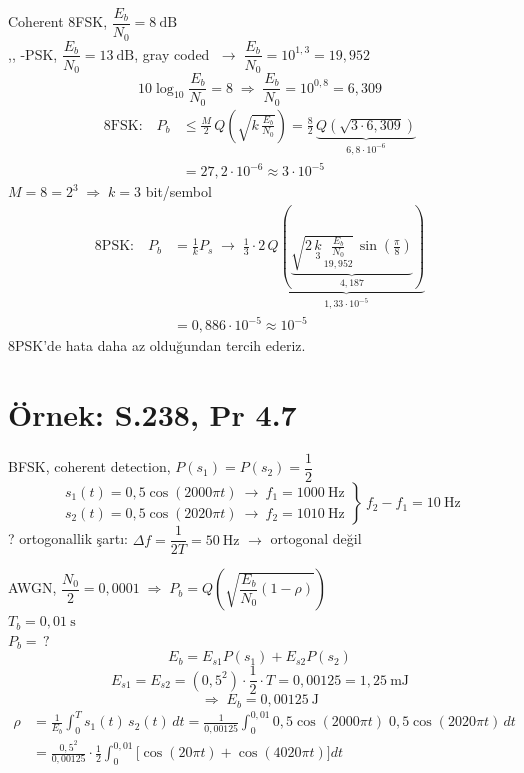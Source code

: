 \documentclass[11pt,a4paper]{article}
\begin{document}
\noindent Coherent 8FSK, $\dfrac{E_b}{N_0}=8\ \mathrm{dB}$ \\
\hspace*{1.5em},, -PSK, $\dfrac{E_b}{N_0}=13\ \mathrm{dB}$, gray coded $\;\rightarrow\;\dfrac{E_b}{N_0}=10^{1{,}3}=19{,}952$
\[ 10\log_{10}\frac{E_b}{N_0}=8 \;\Rightarrow\; \frac{E_b}{N_0}=10^{0{,}8}=6{,}309 \]
\begin{align*}
\text{8FSK:}\quad P_b &\le \frac{M}{2}\,Q\!\left(\sqrt{k\,\frac{E_b}{N_0}}\right)=\frac{8}{2}\,\underbrace{Q\!\left(\sqrt{3\cdot 6{,}309}\right)}_{6{,}8\cdot 10^{-6}}\\
&= 27{,}2\cdot 10^{-6}\approx 3\cdot 10^{-5}
\end{align*}
\noindent $M=8=2^3 \;\Rightarrow\; k=3$ bit/sembol
\begin{align*}
\text{8PSK:}\quad P_b &= \frac{1}{k}P_s \;\rightarrow\; \frac{1}{3}\cdot 2\,\underbrace{Q\!\left(\underbrace{\sqrt{2\,\underset{3}{k}\,\underset{19{,}952}{\frac{E_b}{N_0}}}\,\sin\!\left(\frac{\pi}{8}\right)}_{4{,}187}\right)}_{1{,}33\cdot 10^{-5}}\\
&= 0{,}886\cdot 10^{-5}\approx 10^{-5}
\end{align*}
\noindent 8PSK'de hata daha az olduğundan tercih ederiz.

\section{Örnek: S.238, Pr 4.7}
\noindent BFSK, coherent detection, $P(s_1)=P(s_2)=\dfrac{1}{2}$
\[ \left.\begin{array}{l}
s_1(t)=0{,}5\cos(2000\pi t)\ \rightarrow\ f_1=1000\ \mathrm{Hz}\\
s_2(t)=0{,}5\cos(2020\pi t)\ \rightarrow\ f_2=1010\ \mathrm{Hz}
\end{array}\right\}\ f_2-f_1=10\ \mathrm{Hz} \]
\noindent ? \quad ortogonallik şartı: $\Delta f=\dfrac{1}{2T}=50\ \mathrm{Hz}$ \quad $\rightarrow$ ortogonal değil

\noindent AWGN, $\dfrac{N_0}{2}=0{,}0001 \;\Rightarrow\; P_b=Q\!\left(\sqrt{\dfrac{E_b}{N_0}(1-\rho)}\right)$ \\
$T_b=0{,}01\ \mathrm{s}$ \\
$P_b=\,?$
\[ E_b = E_{s1}P(s_1)+E_{s2}P(s_2) \]
\[ E_{s1}=E_{s2}=(0{,}5^2)\cdot\frac{1}{2}\cdot T = 0{,}00125 = 1{,}25\ \mathrm{mJ} \]
\[ \Rightarrow\; E_b = 0{,}00125\ \mathrm{J} \]
\begin{align*}
\rho &= \frac{1}{E_b}\int_0^T s_1(t)\,s_2(t)\,dt = \frac{1}{0{,}00125}\int_0^{0{,}01} 0{,}5\cos(2000\pi t)\;0{,}5\cos(2020\pi t)\,dt\\
&= \frac{0{,}5^2}{0{,}00125}\cdot\frac{1}{2}\int_0^{0{,}01}\bigl[\cos(20\pi t)+\cos(4020\pi t)\bigr]dt
\end{align*}
\end{document}

